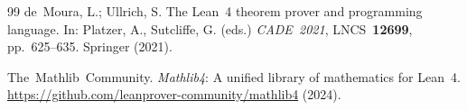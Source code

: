 \documentclass[12pt,a4paper]{article}
\begin{document}
\begin{thebibliography}{99}
de~Moura, L.; Ullrich, S.
\newblock The {L}ean~4 theorem prover and programming language.
\newblock In: Platzer, A., Sutcliffe, G. (eds.) \emph{CADE~2021},
  LNCS~\textbf{12699}, pp.~625--635. Springer (2021).

The~Mathlib~Community.
\newblock \emph{Mathlib4}: A unified library of mathematics for {L}ean~4.
\newblock \url{https://github.com/leanprover-community/mathlib4} (2024).

\end{thebibliography}
\end{document}
